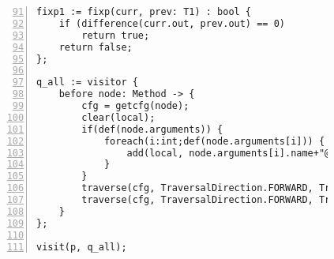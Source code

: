 \begin{figure}[ht!]
\begin{lstlisting}[numbers=left, tabsize=4, caption={Local must not alias},label={lst:lmna-code}, firstline = 91, firstnumber = 91]
fixp1 := fixp(curr, prev: T1) : bool {
	if (difference(curr.out, prev.out) == 0)
		return true;	
	return false;
};

q_all := visitor {
	before node: Method -> {
		cfg = getcfg(node);
		clear(local);
		if(def(node.arguments)) {
			foreach(i:int;def(node.arguments[i])) {
				add(local, node.arguments[i].name+"@argument"+string(i));
			}
		}
		traverse(cfg, TraversalDirection.FORWARD, TraversalKind.HYBRID, init);
		traverse(cfg, TraversalDirection.FORWARD, TraversalKind.HYBRID, alias, fixp1);
	}
};

visit(p, q_all);
\end{lstlisting}
\end{figure}